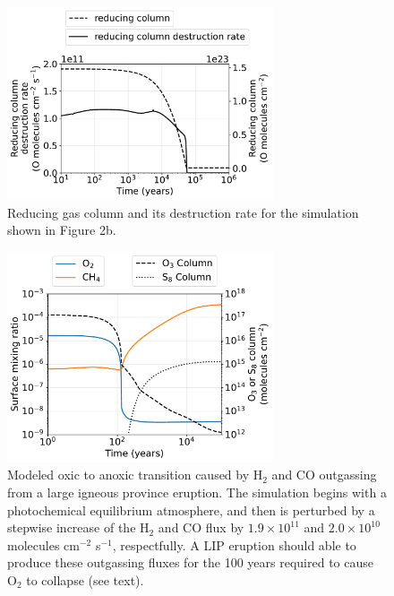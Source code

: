 \documentclass[9pt,twoside,lineno]{pnas-new}
\begin{document}
\begin{figure}
\centering
\includegraphics[width=0.7\textwidth]{figures/Column_rates.pdf}
\caption{Reducing gas column and its destruction rate for the simulation shown in Figure 2b.}
\label{fig:column_rate}
\end{figure}

\begin{figure}
\centering
\includegraphics[width=0.7\textwidth]{figures/Volcanism.pdf}
\caption{Modeled oxic to anoxic transition caused by H$_2$ and CO outgassing from a large igneous province eruption. The simulation begins with a photochemical equilibrium atmosphere, and then is perturbed by a stepwise increase of the H$_2$ and CO flux by $1.9 \times 10^{11}$ and $2.0 \times 10^{10}$ molecules cm$^{-2}$ s$^{-1}$, respectfully. A LIP eruption should able to produce these outgassing fluxes for the 100 years required to cause O$_2$ to collapse (see text).}
\label{fig:volc}
\end{figure}

\FloatBarrier



\end{document}
